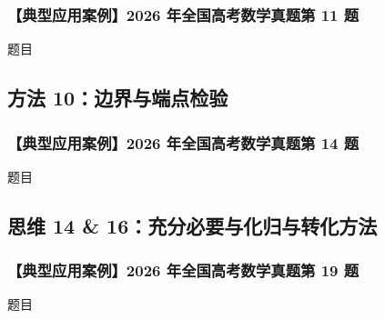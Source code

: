 \documentclass[11pt,a4paper]{ctexart}
\begin{document}
\subsubsection*{【典型应用案例】2026 年全国高考数学真题第 11 题}
\begin{lessonbriefbox}{题目}
\end{lessonbriefbox}

\qConicCircleChordsSolution

\newpage

\subsection{方法 10：边界与端点检验}

\subsubsection*{【典型应用案例】2026 年全国高考数学真题第 14 题}
\begin{lessonbriefbox}{题目}
  \qSeqMaxRatioStem
\end{lessonbriefbox}

\qSeqMaxRatioSolution

\newpage

\subsection{思维 14 \& 16：充分必要与化归与转化方法}

\subsubsection*{【典型应用案例】2026 年全国高考数学真题第 19 题}
\begin{lessonbriefbox}{题目}
  \qFuncSubsetRelationStem
\end{lessonbriefbox}

\qFuncSubsetRelationSolution

\newpage
\end{document}

